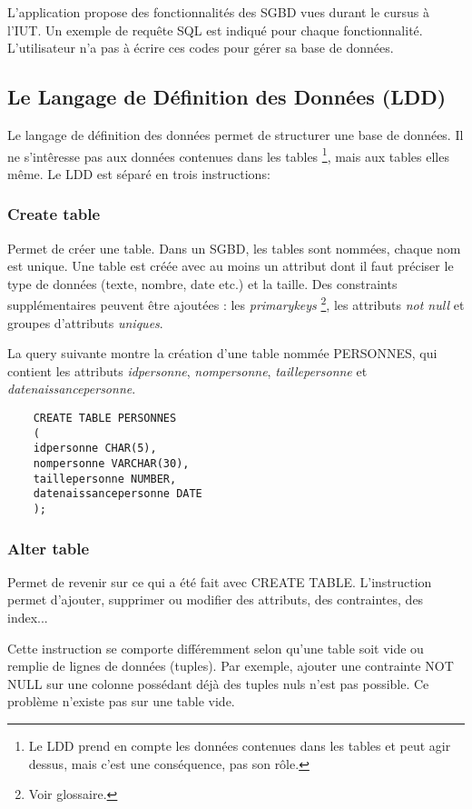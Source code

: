 L'application propose des fonctionnalités des SGBD vues durant le cursus à l'IUT.
Un exemple de requête SQL est indiqué pour chaque fonctionnalité.
L'utilisateur n'a pas à écrire ces codes pour gérer sa base de données.

\subsection{Le Langage de Définition des Données (LDD)}
Le langage de définition des données permet de structurer une base de données.
Il ne s'intêresse pas aux données contenues dans les tables
\footnote{\label{interet_ldd}Le LDD prend en compte les données contenues dans les tables et peut agir dessus, mais c'est une conséquence, pas son rôle.}, mais aux tables elles même. Le LDD est séparé en trois instructions:

\subsubsection{Create table}
Permet de créer une \gls{table}. Dans un SGBD, les tables sont nommées, chaque nom est unique.
Une table est créée avec au moins un attribut dont il faut préciser le type de données (texte, nombre, date etc.) et la taille.
Des \glspl{constraint} supplémentaires peuvent être ajoutées : les \textit{\glspl{primarykey}} \footnote{\label{contrainte_clée_primaire}Voir glossaire.}, les attributs \textit{not null} et groupes d'attributs \textit{uniques}.

La \gls{query} suivante montre la création d'une table nommée PERSONNES, qui contient les attributs \textit{idpersonne}, \textit{nompersonne}, \textit{taillepersonne} et \textit{datenaissancepersonne}.

  \begin{lstlisting}
    CREATE TABLE PERSONNES
    (
    idpersonne CHAR(5),
    nompersonne VARCHAR(30),
    taillepersonne NUMBER,
    datenaissancepersonne DATE
    );
  \end{lstlisting}

\subsubsection{Alter table}
Permet de revenir sur ce qui a été fait avec CREATE TABLE.
L'instruction permet d'ajouter, supprimer ou modifier des \glspl{attribut}, des contraintes, des index...

Cette instruction se comporte différemment selon qu'une table soit vide ou remplie de lignes de données (\glspl{tuple}).
Par exemple, ajouter une contrainte NOT NULL sur une colonne possédant déjà des tuples nuls n'est pas possible. Ce problème n'existe pas sur une table vide.

